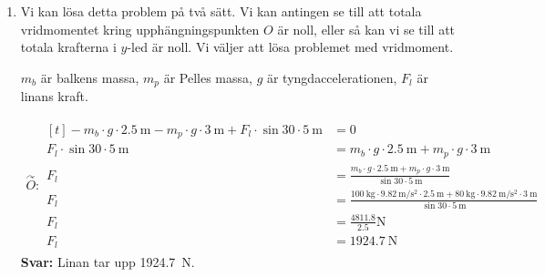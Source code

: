 \documentclass[11pt]{article}
\begin{document}
\begin{enumerate}[itemsep=2em]
        \item
              Vi kan lösa detta problem på två sätt. Vi kan antingen se till att totala vridmomentet kring upphängningspunkten $O$ är noll, eller så kan vi se till att totala krafterna i $y$-led är noll. Vi väljer att lösa problemet med vridmoment.

              $m_b$ är balkens massa, $m_p$ är Pelles massa, $g$ är tyngdaccelerationen, $F_l$ är linans kraft.

              \begin{align*}
                      \overset{\curvearrowright}{O} : \begin{aligned}[t]
                                                              - m_b \cdot g \cdot \SI{2.5}{\meter} - m_p \cdot g \cdot \SI{3}{\meter} + F_{l} \cdot \sin{30} \cdot \SI{5}{\meter} & = 0                                                                                                                                                                                                          \\
                                                              F_l \cdot \sin{30} \cdot \SI{5}{\meter}                                                                             & = m_b \cdot g \cdot \SI{2.5}{\meter} + m_p \cdot g \cdot \SI{3}{\meter}                                                                                                                                      \\
                                                              F_l                                                                                                                 & = \frac{m_b \cdot g \cdot \SI{2.5}{\meter} + m_p \cdot g \cdot \SI{3}{\meter}}{\sin{30} \cdot \SI{5}{\meter}}                                                                                                \\
                                                              F_l                                                                                                                 & = \frac{\SI{100}{\kilogram} \cdot \SI{9.82}{\meter/\second\squared} \cdot \SI{2.5}{\meter} + \SI{80}{\kilogram} \cdot \SI{9.82}{\meter/\second\squared} \cdot \SI{3}{\meter}}{\sin{30} \cdot \SI{5}{\meter}} \\
                                                              F_l                                                                                                                 & = \frac{4811.8}{2.5} \mathrm{N}                                                                                                                                                                              \\
                                                              F_l                                                                                                                 & = \SI{1924.7}{\newton}
                                                      \end{aligned}
              \end{align*}
              \textbf{Svar:} Linan tar upp \SI{1924.7}{\newton}.

\end{enumerate}
\vfill
\begin{center}
\end{center}
\end{document}
